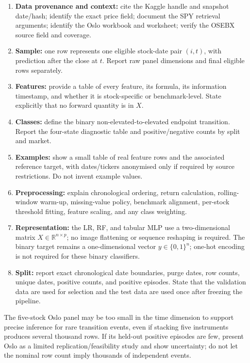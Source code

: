 \documentclass[11pt,a4paper]{article}
\begin{document}
\begin{enumerate}
  \item \textbf{Data provenance and context:} cite the Kaggle handle and snapshot date/hash; identify the exact price field; document the SPY retrieval arguments; identify the Oslo workbook and worksheet; verify the OSEBX source field and coverage.
  \item \textbf{Sample:} one row represents one eligible stock-date pair $(i,t)$, with prediction after the close at $t$. Report raw panel dimensions and final eligible rows separately.
  \item \textbf{Features:} provide a table of every feature, its formula, its information timestamp, and whether it is stock-specific or benchmark-level. State explicitly that no forward quantity is in $X$.
  \item \textbf{Classes:} define the binary non-elevated-to-elevated endpoint transition. Report the four-state diagnostic table and positive/negative counts by split and market.
  \item \textbf{Examples:} show a small table of real feature rows and the associated reference target, with dates/tickers anonymised only if required by source restrictions. Do not invent example values.
  \item \textbf{Preprocessing:} explain chronological ordering, return calculation, rolling-window warm-up, missing-value policy, benchmark alignment, per-stock threshold fitting, feature scaling, and any class weighting.
  \item \textbf{Representation:} the LR, RF, and tabular MLP use a two-dimensional matrix $X\in\mathbb{R}^{n\times p}$; no image flattening or sequence reshaping is required. The binary target remains a one-dimensional vector $y\in\{0,1\}^n$; one-hot encoding is not required for these binary classifiers.
  \item \textbf{Split:} report exact chronological date boundaries, purge dates, row counts, unique dates, positive counts, and positive episodes. State that the validation data are used for selection and the test data are used once after freezing the pipeline.
\end{enumerate}

\begin{warningbox}
The five-stock Oslo panel may be too small in the time dimension to support precise inference for rare transition events, even if stacking five instruments produces several thousand rows. If its held-out positive episodes are few, present Oslo as a limited replication/feasibility study and show uncertainty; do not let the nominal row count imply thousands of independent events.
\end{warningbox}
\end{document}
